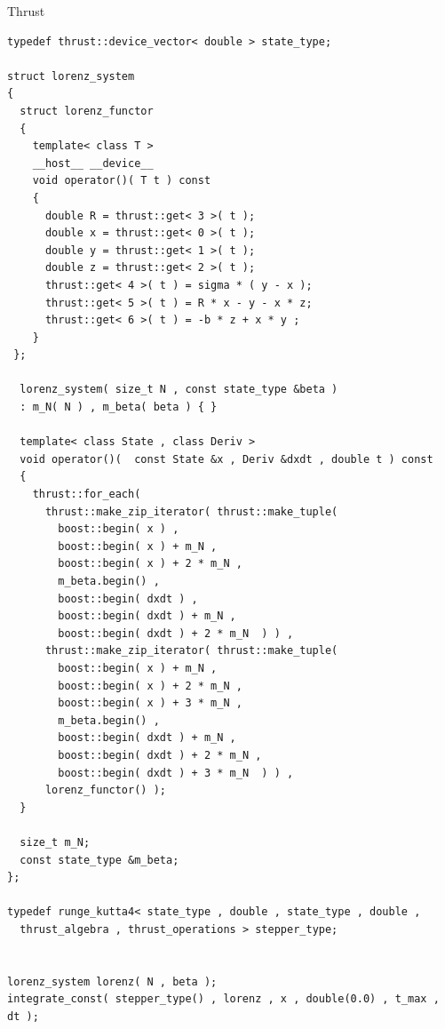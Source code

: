 \documentclass{beamer}
\newcommand{\heading}[1]{\centerline{\Large #1} \vspace{0.5em}}
\begin{document}
\begin{frame}[fragile]
 \heading{Thrust}


\begin{lstlisting}[basicstyle=\tiny\ttfamily]
typedef thrust::device_vector< double > state_type;

struct lorenz_system
{
  struct lorenz_functor
  {
    template< class T >
    __host__ __device__
    void operator()( T t ) const
    {
      double R = thrust::get< 3 >( t );
      double x = thrust::get< 0 >( t );
      double y = thrust::get< 1 >( t );
      double z = thrust::get< 2 >( t );
      thrust::get< 4 >( t ) = sigma * ( y - x );
      thrust::get< 5 >( t ) = R * x - y - x * z;
      thrust::get< 6 >( t ) = -b * z + x * y ;
    }
 };

  lorenz_system( size_t N , const state_type &beta )
  : m_N( N ) , m_beta( beta ) { }

  template< class State , class Deriv >
  void operator()(  const State &x , Deriv &dxdt , double t ) const
  {
    thrust::for_each(
      thrust::make_zip_iterator( thrust::make_tuple(
        boost::begin( x ) ,
        boost::begin( x ) + m_N ,
        boost::begin( x ) + 2 * m_N ,
        m_beta.begin() ,
        boost::begin( dxdt ) ,
        boost::begin( dxdt ) + m_N ,
        boost::begin( dxdt ) + 2 * m_N  ) ) ,
      thrust::make_zip_iterator( thrust::make_tuple(
        boost::begin( x ) + m_N ,
        boost::begin( x ) + 2 * m_N ,
        boost::begin( x ) + 3 * m_N ,
        m_beta.begin() ,
        boost::begin( dxdt ) + m_N ,
        boost::begin( dxdt ) + 2 * m_N ,
        boost::begin( dxdt ) + 3 * m_N  ) ) ,
      lorenz_functor() );
  }

  size_t m_N;
  const state_type &m_beta;
};

typedef runge_kutta4< state_type , double , state_type , double ,
  thrust_algebra , thrust_operations > stepper_type;


lorenz_system lorenz( N , beta );
integrate_const( stepper_type() , lorenz , x , double(0.0) , t_max , dt );
\end{lstlisting}


\end{frame}
\end{document}

